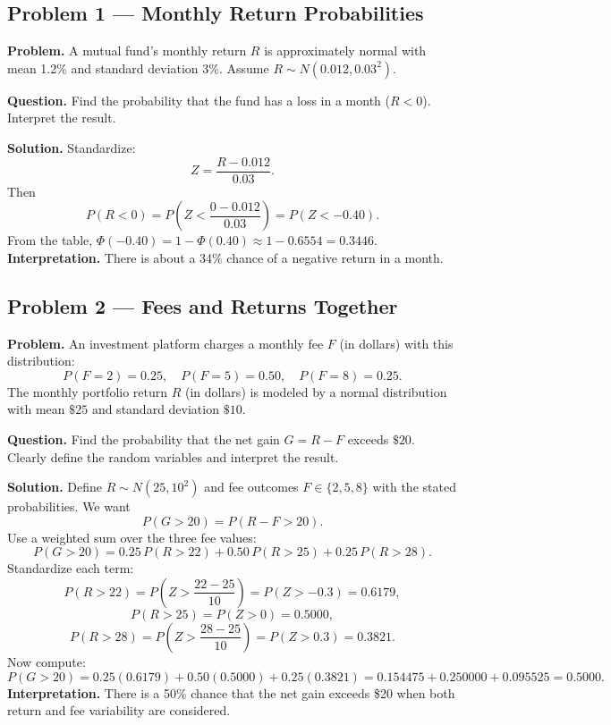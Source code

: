 	
	\begin{ExamProblems}
		
		\hypertarget{c10-ex1}{}
		\item
		\subsection*{Problem 1 — Monthly Return Probabilities}
		
		\textbf{Problem.}
		A mutual fund's monthly return \(R\) is approximately normal with mean 1.2\% and
		standard deviation 3\%. Assume \(R\sim N(0.012,0.03^2)\).
		
		\textbf{Question.} Find the probability that the fund has a loss in a month
		(\(R<0\)). Interpret the result.
		
		\textbf{Solution.}
		Standardize:
		\[
		Z=\frac{R-0.012}{0.03}.
		\]
		Then
		\[
		P(R<0)=P\left(Z<\frac{0-0.012}{0.03}\right)=P(Z<-0.40).
		\]
		From the table, \(\Phi(-0.40)=1-\Phi(0.40)\approx 1-0.6554=0.3446\).
		\textbf{Interpretation.} There is about a 34\% chance of a negative return in a month.
		
		
		\hypertarget{c10-ex2}{}
		\item
		\subsection*{Problem 2 — Fees and Returns Together}
		
		\textbf{Problem.}
		An investment platform charges a monthly fee \(F\) (in dollars) with this distribution:
		\[
		P(F=2)=0.25,\quad P(F=5)=0.50,\quad P(F=8)=0.25.
		\]
		The monthly portfolio return \(R\) (in dollars)
		is modeled by a normal distribution with mean \(\$25\) and standard deviation \(\$10\).
		
		\textbf{Question.} Find the probability that the net gain \(G=R-F\) exceeds \(\$20\).
		Clearly define the random variables and interpret the result.
		
		\textbf{Solution.}
		Define \(R\sim N(25,10^2)\) and fee outcomes \(F\in\{2,5,8\}\) with the stated probabilities.
		We want
		\[
		P(G>20)=P(R-F>20).
		\]
		Use a weighted sum over the three fee values:
		\[
		P(G>20)=0.25\,P(R>22)+0.50\,P(R>25)+0.25\,P(R>28).
		\]
		Standardize each term:
		\[
		P(R>22)=P\left(Z>\frac{22-25}{10}\right)=P(Z>-0.3)=0.6179,
		\]
		\[
		P(R>25)=P(Z>0)=0.5000,
		\]
		\[
		P(R>28)=P\left(Z>\frac{28-25}{10}\right)=P(Z>0.3)=0.3821.
		\]
		Now compute:
		\[
		P(G>20)=0.25(0.6179)+0.50(0.5000)+0.25(0.3821)
		=0.154475+0.250000+0.095525=0.5000.
		\]
		\textbf{Interpretation.} There is a 50\% chance that the net gain exceeds \$20
		when both return and fee variability are considered.
		
	\end{ExamProblems}
	

